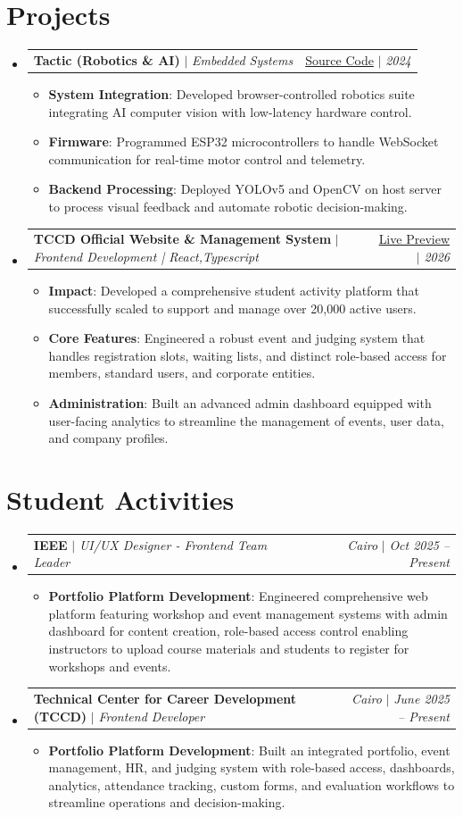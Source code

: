 \documentclass[letterpaper,11pt]{article}
\makeatletter
\newcommand{\resumeItem}[2]{\item\small{\textbf{#1}{: #2 \vspace{-2pt}}}}
\newcommand{\resumeProjectSubheading}[3]{
  \vspace{-1pt}\item
    \begin{tabular*}{0.97\textwidth}{l@{\extracolsep{\fill}}r}
      \textbf{#1} $|$ \textit{\small#2} & #3 \\
    \end{tabular*}\vspace{-5pt}
}
\newcommand{\resumeActivitySubheading}[4]{
  \vspace{-1pt}\item
    \begin{tabular*}{0.97\textwidth}{l@{\extracolsep{\fill}}r}
      \textbf{#1} $|$ \textit{\small#3} & \textit{\small#2} $|$ \textit{\small #4} \\
    \end{tabular*}\vspace{-5pt}
}
\newcommand{\resumeSubHeadingListStart}{\begin{itemize}[leftmargin=*]}
\newcommand{\resumeSubHeadingListEnd}{\end{itemize}}
\newcommand{\resumeItemListStart}{\begin{itemize}}
\newcommand{\resumeItemListEnd}{\end{itemize}\vspace{-5pt}}
\makeatother
\begin{document}
\section{Projects}
  \resumeSubHeadingListStart
    \resumeProjectSubheading
      {Tactic (Robotics \& AI)}{Embedded Systems}{\href{https://github.com/roboSobia}{Source Code} $|$ \textit{\small 2024}}
      \resumeItemListStart
        \resumeItem{System Integration}
          {Developed browser-controlled robotics suite integrating AI computer vision with low-latency hardware control.}
        \resumeItem{Firmware}
          {Programmed ESP32 microcontrollers to handle WebSocket communication for real-time motor control and telemetry.}
        \resumeItem{Backend Processing}
          {Deployed YOLOv5 and OpenCV on host server to process visual feedback and automate robotic decision-making.}
      \resumeItemListEnd
    \vspace{4pt}
    \resumeProjectSubheading
      {TCCD Official Website \& Management System}{Frontend Development | React,Typescript}{\href{https://tccd.eng.cu.edu.eg/}{Live Preview} $|$ \textit{\small 2026}}
      \resumeItemListStart
        \resumeItem{Impact}
          {Developed a comprehensive student activity platform that successfully scaled to support and manage over 20,000 active users.}
        \resumeItem{Core Features}
          {Engineered a robust event and judging system that handles registration slots, waiting lists, and distinct role-based access for members, standard users, and corporate entities.}
        \resumeItem{Administration}
          {Built an advanced admin dashboard equipped with user-facing analytics to streamline the management of events, user data, and company profiles.}
      \resumeItemListEnd
  \resumeSubHeadingListEnd
\section{Student Activities}
  \resumeSubHeadingListStart
    \resumeActivitySubheading
      {IEEE}{Cairo}{UI/UX Designer - Frontend Team Leader}{Oct 2025 -- Present}
      \resumeItemListStart
        \resumeItem{Portfolio Platform Development}
          {Engineered comprehensive web platform featuring workshop and event management systems with admin dashboard for content creation, role-based access control enabling instructors to upload course materials and students to register for workshops and events.}
      \resumeItemListEnd
    \vspace{4pt}
    \resumeActivitySubheading
      {Technical Center for Career Development (TCCD)}{Cairo}{Frontend Developer}{June 2025 -- Present}
      \resumeItemListStart
        \resumeItem{Portfolio Platform Development}
          {Built an integrated portfolio, event management, HR, and judging system with role-based access, dashboards, analytics, attendance tracking, custom forms, and evaluation workflows to streamline operations and decision-making.}
      \resumeItemListEnd
  \resumeSubHeadingListEnd
\end{document}
